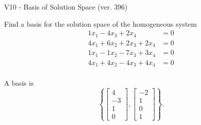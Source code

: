 \begin{exercise}
  \begin{exerciseTitle}V10 - Basis of Solution Space (ver. 396)\end{exerciseTitle}
  \begin{exerciseStatement}
    Find a basis for the solution space of the homogeneous system 
\begin{align*}
 1 x_ 1 -4 x_ 3 + 2 x_ 4 &= 0  \\ 
  4 x_ 1 + 6 x_ 2 + 2 x_ 3 + 2 x_ 4 &= 0  \\ 
  1 x_ 1 -1 x_ 2 -7 x_ 3 + 3 x_ 4 &= 0  \\ 
  4 x_ 1 + 4 x_ 2 -4 x_ 3 + 4 x_ 4 &= 0  \\ 
 \end{align*}


 
  \end{exerciseStatement}

  \begin{exerciseAnswer}
   A basis is   
\[\left\{\left[\begin{array}{c}
4 \\
-3 \\
1 \\
0
\end{array}\right] , \left[\begin{array}{c}
-2 \\
1 \\
0 \\
1
\end{array}\right]\right\}.\]

  


  \end{exerciseAnswer}
\end{exercise}